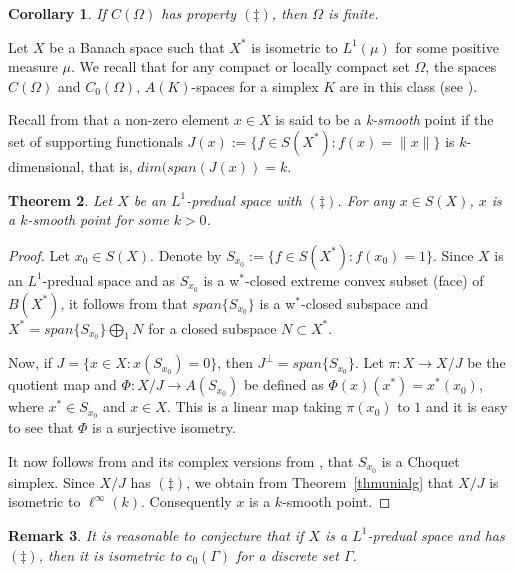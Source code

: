 \documentclass[11pt]{amsart}
\newtheorem{thm}{Theorem}
\newtheorem{cor}[thm]{Corollary}
\newtheorem{rem}[thm]{Remark}
\begin{document}
\begin{cor}
If $C(\Omega)$ has property $(\ddag)$, then $\Omega$ is finite.
\end{cor}

Let $X$ be a Banach space such that $X^\ast$ is isometric to $L^1(\mu)$ for some positive measure $\mu$. We recall that for any compact or locally compact set $\Omega$, the spaces $C(\Omega)$ and $C_0(\Omega)$, $A(K)$-spaces for a simplex $K$ are in this class (see \cite{L}). 

Recall from \cite{LR} that a non-zero element $x \in X$ is said to be a \textit{k-smooth} point if the set of supporting functionals $J(x):=\{f \in S(X^*): f(x)=\|x\|\}$ is $k$-dimensional, that is, $dim(span(J(x))=k$.

\begin{thm} \label{L1predual}
Let $X$ be an $L^1$-predual space with $(\ddag)$.  For any $x \in S(X)$, $x$ is a $k$-smooth point for some $k>0$.
 \end{thm}
 
 \begin{proof} Let $x_0 \in S(X)$. Denote by $S_{x_0}:=\{f \in S(X^*) : f(x_0)=1\}$. Since $X$ is an $L^1$-predual space and as $S_{x_0}$ is a w$^*$-closed extreme convex subset (face) of $B(X^*)$,
 it follows from \cite[Theorem 3.3]{E}  that $span\{S_{x_0}\}$ is a w$^*$-closed subspace and $X^\ast = span\{S_{x_0}\} \bigoplus_1 N$ for a closed subspace $N \subset X^\ast$. 
 
 Now, if $J = \{x \in X: x(S_{x_0})=0\}$, then $J^\bot = span\{S_{x_0}\}$. Let $\pi: X \rightarrow X/J$ be the quotient map and  $\Phi: X/J \rightarrow A(S_{x_0})$ be defined as $\Phi(x)(x^\ast)= x^\ast(x_0)$, where $x^\ast \in S_{x_0}$ and $x \in X$. This is a linear map taking $\pi(x_0)$ to $1$ and it is easy to see that $\Phi$ is a surjective isometry. 
 
 It now follows from \cite[Theorem 2, Section 19]{L} and its complex versions from \cite[Section 20]{L}, that $S_{x_0}$ is a Choquet simplex. Since $X/J$ has $(\ddag)$, we obtain from Theorem~\ref{thmunialg} that $X/J$ is isometric to $\ell^\infty(k)$. Consequently $x$ is a $k$-smooth point.
 \end{proof}
 
  \begin{rem} It is reasonable to conjecture that if $X$ is a $L^1$-predual space and has $(\ddag)$, then it is isometric to $c_0(\Gamma)$ for a discrete set $\Gamma$.
\end{rem}
\end{document}

